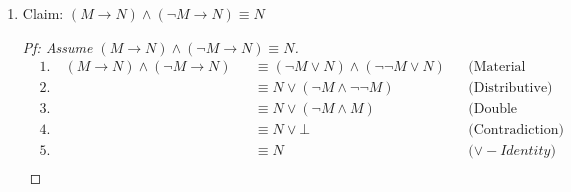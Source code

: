 \documentclass{article}
\begin{document}
\begin{enumerate}
\begin{enumerate}
\begin{proof}[Pf: Assume $P \land (\neg Q \rightarrow R) \equiv (P \rightarrow \neg R) \rightarrow (P \land Q)$]
            \begin{align*}
                &1. \quad P \land (\neg Q \rightarrow R) && \equiv P \land (\neg \neg Q \lor R) && \text{(Material Implication)} \\
                &2. \quad && \equiv P \land (Q \lor R) && \text{(Double Negation)} \\
                &3. \quad (P \rightarrow \neg R) \rightarrow (P \land Q) && \equiv \neg (\neg P \lor \neg R) \lor (P \land Q) && \text{(Material Implication)} \\
                &4. \quad && \equiv (\neg \neg P \land \neg \neg R) \lor (P \land Q) && \text{(De Morgan's)} \\
                &5. \quad && \equiv (P \land R) \lor (P \land Q) && \text{(Double Negation)} \\
                &6. \quad && \equiv P \land (Q \lor R) && \text{(Distributive)}
            \end{align*}
        \end{proof}
        \item
        Claim: $(M \rightarrow N) \land (\neg M \rightarrow N) \equiv N$
        \begin{proof}[Pf: Assume $(M \rightarrow N) \land (\neg M \rightarrow N) \equiv N$]
            \begin{align*}
                &1. \quad (M \rightarrow N) \land (\neg M \rightarrow N) && \equiv (\neg M \lor N) \land (\neg \neg M \lor N) && \text{(Material Implication)} \\
                &2. \quad && \equiv N \lor (\neg M \land \neg \neg M) && \text{(Distributive)} \\
                &3. \quad && \equiv N \lor (\neg M \land M) && \text{(Double Negation)} \\
                &4. \quad && \equiv N \lor \bot && \text{(Contradiction)} \\
                &5. \quad && \equiv N && \text{($\lor - Identity$)} \\
            \end{align*}
        \end{proof}
    \end{enumerate}
\end{enumerate}
\end{document}
